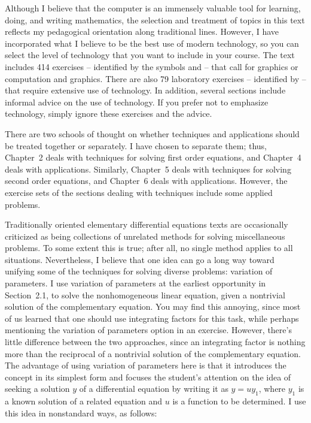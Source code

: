 Although I believe that the computer is an immensely valuable tool for learning, doing, and writing
mathematics, the selection and treatment of topics in this text reflects my pedagogical orientation
along traditional lines. However, I have incorporated what I believe to be the best use of modern
technology, so you can select the level of technology that you want to include in your course. The
text includes 414 exercises -- identified by the symbols \Cex and \CGex -- that call for graphics or
computation and graphics. There are also 79 laboratory exercises -- identified by \Lex -- that
require extensive use of technology. In addition, several sections include informal advice on the
use of technology. If you prefer not to emphasize technology, simply ignore these exercises and the
advice.

There are two schools of thought on whether techniques and applications should be treated together
or separately. I have chosen to separate them; thus, Chapter~2 deals with techniques for solving
first order equations, and Chapter~4 deals with applications. Similarly, Chapter~5 deals with
techniques for solving second order equations, and Chapter~6 deals with applications. However, the
exercise sets of the sections dealing with techniques include some applied problems.

Traditionally oriented elementary differential equations texts are occasionally criticized as being
collections of unrelated methods for solving miscellaneous problems. To some extent this is true;
after all, no single method applies to all situations. Nevertheless, I believe that one idea can go
a long way toward unifying some of the techniques for solving diverse problems: variation of
parameters. I use variation of parameters at the earliest opportunity in Section~2.1, to solve the
nonhomogeneous linear equation, given a nontrivial solution of the complementary equation. You may
find this annoying, since most of us learned that one should use integrating factors for this task,
while perhaps mentioning the variation of parameters option in an exercise. However, there's little
difference between the two approaches, since an integrating factor is nothing more than the
reciprocal of a nontrivial solution of the complementary equation. The advantage of using variation
of parameters here is that it introduces the concept in its simplest form and focuses the student's
attention on the idea of seeking a solution $y$ of a differential equation by writing it as
$y=uy_{1}$, where $y_{1}$ is a known solution of a related equation and $u$ is a function to be
determined. I use this idea in nonstandard ways, as follows:

